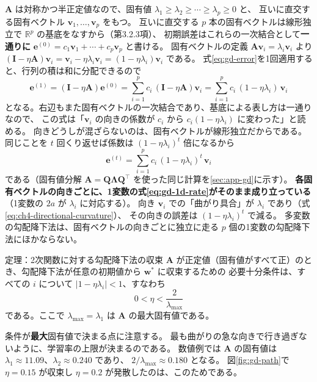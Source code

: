 $\bm{A}$ は対称かつ半正定値なので、固有値 $\lambda_1 \geq \lambda_2 \geq \cdots \geq \lambda_p \geq 0$ と、
互いに直交する固有ベクトル $\bm{v}_1, \ldots, \bm{v}_p$ をもつ。
互いに直交する $p$ 本の固有ベクトルは線形独立で $\mathbb{R}^p$ の基底をなすから（第3.2.3項）、
初期誤差はこれらの一次結合として\textbf{一通りに} $\bm{e}^{(0)} = c_1 \bm{v}_1 + \cdots + c_p \bm{v}_p$ と書ける。
固有ベクトルの定義 $\bm{A}\bm{v}_i = \lambda_i\bm{v}_i$ より
$(\bm{I} - \eta\bm{A})\bm{v}_i = \bm{v}_i - \eta\lambda_i\bm{v}_i = (1 - \eta\lambda_i)\bm{v}_i$ である。
式\eqref{eq:gd-error}を1回適用すると、行列の積は和に分配できるので
\begin{equation*}
  \bm{e}^{(1)} = (\bm{I} - \eta\bm{A})\bm{e}^{(0)}
  = \sum_{i=1}^{p} c_i\,(\bm{I} - \eta\bm{A})\bm{v}_i
  = \sum_{i=1}^{p} c_i\,(1 - \eta\lambda_i)\,\bm{v}_i
\end{equation*}
となる。右辺もまた固有ベクトルの一次結合であり、基底による表し方は一通りなので、
この式は「$\bm{v}_i$ の向きの係数が $c_i$ から $c_i(1 - \eta\lambda_i)$ に変わった」と読める。
向きどうしが混ざらないのは、固有ベクトルが線形独立だからである。
同じことを $t$ 回くり返せば係数は $(1 - \eta\lambda_i)^t$ 倍になるから
\begin{equation}
  \bm{e}^{(t)} = \sum_{i=1}^{p} c_i\,(1 - \eta\lambda_i)^t\, \bm{v}_i
  \label{eq:gd-error-eig}
\end{equation}
である（固有値分解 $\bm{A} = \bm{Q}\bm{\Lambda}\bm{Q}^\top$ を使った同じ計算を\ref{sec:app-gd}に示す）。
\textbf{各固有ベクトルの向きごとに、1変数の式\eqref{eq:gd-1d-rate}がそのまま成り立っている}
（1変数の $2a$ が $\lambda_i$ に対応する）。
向き $\bm{v}_i$ での「曲がり具合」が $\lambda_i$ であり（式\eqref{eq:ch4-directional-curvature}）、
その向きの誤差は $(1 - \eta\lambda_i)^t$ で減る。
多変数の勾配降下法は、固有ベクトルの向きごとに独立に走る $p$ 個の1変数の勾配降下法にほかならない。

\begin{itembox}[l]{定理：2次関数に対する勾配降下法の収束}
$\bm{A}$ が正定値（固有値がすべて正）のとき、勾配降下法が任意の初期値から $\bm{w}^*$ に収束するための
必要十分条件は、すべての $i$ について $|1 - \eta\lambda_i| < 1$、すなわち
\begin{equation}
  0 < \eta < \frac{2}{\lambda_{\max}}
  \label{eq:gd-cond}
\end{equation}
である。ここで $\lambda_{\max} = \lambda_1$ は $\bm{A}$ の最大固有値である。
\end{itembox}

条件が\textbf{最大}固有値で決まる点に注意する。
最も曲がりの急な向きで行き過ぎないように、学習率の上限が決まるのである。
数値例では $\bm{A}$ の固有値は $\lambda_1 \approx 11.09$、$\lambda_2 \approx 0.240$ であり、
$2/\lambda_{\max} \approx 0.180$ となる。
図\ref{fig:gd-path}で $\eta = 0.15$ が収束し $\eta = 0.2$ が発散したのは、このためである。

